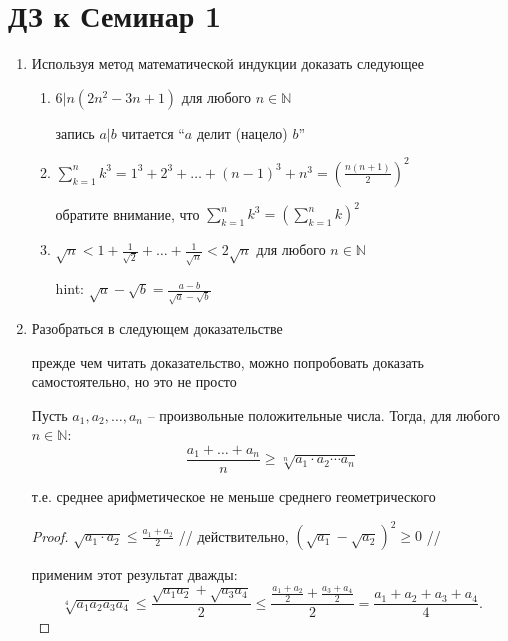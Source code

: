 \documentclass[a4paper]{article}
\begin{document}
    \section*{ДЗ к Семинар 1}

    \begin{enumerate}
    \item
        Используя метод математической индукции доказать следующее
        \begin{enumerate}[label=\alph*)]
        \item 
            $6 | n(2n^2 - 3n + 1)$ для любого $n \in \mathbb{N}$ 

            запись $a|b$ читается ``$a$ делит (нацело) $b$''
        \item
            $\sum_{k=1}^n k^3 = 1^3 + 2^3 + \dots + (n - 1)^3 + n^3 = \left( \frac{n(n + 1)}{2} \right)^2$

            обратите внимание, что $\sum_{k=1}^n k^3 = \left( \sum_{k=1}^n k \right)^2$
        \item 
            $\sqrt{n} < 1 + \frac{1}{\sqrt{2}} + \dots + \frac{1}{\sqrt{n}} < 2 \sqrt{n}$ для любого $n \in \mathbb{N}$

            hint: $\sqrt{a} - \sqrt{b} = \frac{a - b}{\sqrt{a} - \sqrt{b}}$
        \end{enumerate}

    \item 
        Разобраться в следующем доказательстве
        
        прежде чем читать доказательство, можно попробовать доказать самостоятельно, но это не просто

        Пусть $a_1, a_2, \dots, a_n$ -- произвольные положительные числа.
        Тогда, для любого $n \in \mathbb{N}$:
        \begin{equation}
            \frac{a_1 + \dots + a_n}{n} \geq \sqrt[n]{a_1 \cdot a_2 \cdots a_n}
            \tag{$\star$}
        \end{equation}

        т.е. среднее арифметическое не меньше среднего геометрического

        \begin{proof}
            $\sqrt{a_1 \cdot a_2} \leq \frac{a_1 + a_2}{2}$ // действительно, $(\sqrt{a_1} - \sqrt{a_2})^2 \geq 0$ //
            
            применим этот результат дважды:
            \[
                \sqrt[4]{a_1 a_2 a_3 a_4} 
                \leq \frac{\sqrt{a_1 a_2} + \sqrt{a_3 a_4}}{2} 
                \leq \frac{\frac{a_1 + a_2}{2} + \frac{a_3 + a_4}{2}}{2} 
                = \frac{a_1 + a_2 + a_3 + a_4}{4}.
            \]


\end{proof}
\end{enumerate}
\end{document}
